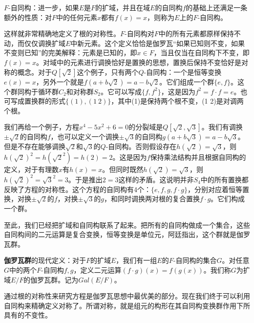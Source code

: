 \documentclass[b5paper]{ctexart}
\begin{document}
\begin{definition}
$F$-自同构：进一步，如果$E$是$F$的扩域，并且在域$E$的自同构$f$的基础上还满足一条额外的性质：对$F$中的任何元素$x$都有$f(x) = x$，则称为$E$上的$F$-自同构。
\end{definition}

这样就非常精确地定义了根的对称性。$F$-自同构对$F$中的所有元素都原样保持不动，而仅仅调换扩域$E$中新元素。这个定义恰恰是伽罗瓦“如果已知则不变，如果不变则已知”的完美解释：元素是已知的，即$x \in F$，当且仅当在自同构下不变，即$f(x) = x$。对域中的元素进行调换恰好是置换的思想，置换后保持不变恰好是对称的概念。对于$Q[\sqrt{2}]$这个例子，只有两个$Q$-自同构：一个是恒等变换$e(x) = x$，另外一个就是$f(a + b\sqrt{2}) = a - b\sqrt{2}$。它们组成一个群$\{e, f\}$。这个群同构于循环群$C_2$和对称群$S_2$。它可以写成$\{f, f^2\}$，这是因为$f^2 = f \cdot f = e$。也可写成置换群的形式$\{(1), (1\ 2)\}$，其中(1)是保持两个根不变，(1 2)是对调两个根。

我们再给一个例子，方程$x^4 - 5x^2 + 6 = 0$的分裂域是$Q[\sqrt{2}, \sqrt{3}]$。我们有调换$\pm \sqrt{2}$的自同构$f$，也可以定义一个调换$\pm \sqrt{3}$的自同构$g(a + b\sqrt{3}) = a - b\sqrt{3}$。但是不存在能够调换$\sqrt{2}$和$\sqrt{3}$的$Q$-自同构。否则假设存在$h(\sqrt{2}) = \sqrt{3}$，则$h(\sqrt{2})^2 = h(\sqrt{2}^2) = h(2) = 2$。这是因为$f$保持乘法结构并且根据自同构的定义，对于有理数$x$有$h(x) = x$。但同时既然$h(\sqrt{2}) = \sqrt{3}$，则$h(\sqrt{2})^2 = \sqrt{3}^2 = 3$。于是推出$2 = 3$这样的矛盾。这说明并非$S_4$中的所有置换都反映了方程的对称性。这个方程的自同构有4个：$\{e, f, g, f \cdot g\}$，分别对应着恒等置换，对换$\pm \sqrt{2}$的$f$，对换$\pm \sqrt{3}$的$g$，和同时调换两对根的复合置换$f \cdot g$。它们构成一个群。

至此，我们已经把扩域和自同构联系了起来。把所有的自同构做成一个集合，这些自同构间的二元运算是复合变换，恒等变换是单位元，阿廷指出，这个群就是伽罗瓦群。

\begin{definition}
\textbf{伽罗瓦群}的现代定义：对于$F$的扩域$E$，我们有一组$E$的$F$-自同构的集合$G$。对任意$G$中的两个$F$-自同构$f, g$，定义二元运算$(f \cdot g)(x) = f(g(x))$。我们称$G$为扩域$E/F$的伽罗瓦群。记为$Gal(E/F)$。
\end{definition}

\begin{mdframed}
通过根的对称性来研究方程是伽罗瓦思想中最优美的部分。现在我们终于可以利用自同构来精确定义对称了。所谓对称，就是组元的构形在其自同构变换群作用下所具有的不变性。
\end{mdframed}
\end{document}
